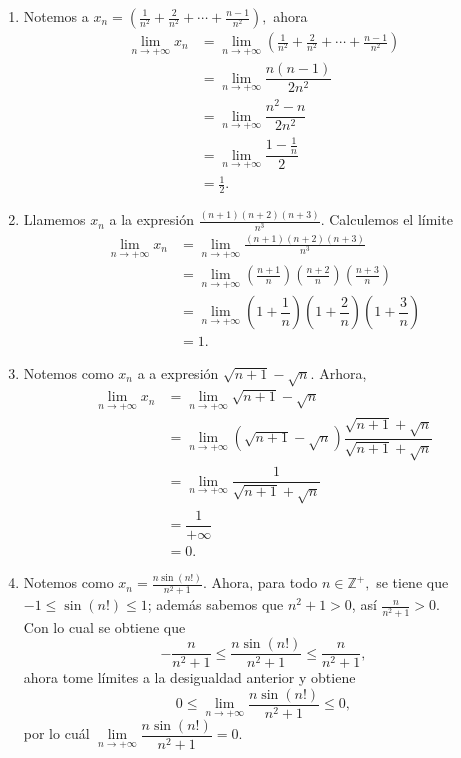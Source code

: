 	\begin{example}
		\begin{enumerate}
			\item Notemos a \(x_n=\left(\frac{1}{n^2}+\frac{2}{n^2}+\cdots+\frac{n-1}{n^2}\right),\) ahora
			\begin{align*}
			\lim\limits_{n\to+\infty}{x_n}&=\lim\limits_{n\to+\infty}\left(\frac{1}{n^2}+\frac{2}{n^2}+\cdots+\frac{n-1}{n^2}\right)\\
			&=\lim\limits_{n\to+\infty}\dfrac{n(n-1)}{2n^2}\\
			&=\lim\limits_{n\to+\infty}{\dfrac{n^2-n}{2n^2}}\\
			&=\lim\limits_{n\to+\infty}{\dfrac{1-\frac{1}{n}}{2}}\\
			&=\frac{1}{2}.
			\end{align*}
			
			\item Llamemos \(x_n\) a la expresi\'on \(\frac{(n+1)(n+2)(n+3)}{n^3}.\) Calculemos el l\'imite
			\begin{align*}
			\lim\limits_{n\to+\infty}{x_n}&=\lim\limits_{n\to+\infty}{\frac{(n+1)(n+2)(n+3)}{n^3}}\\
			&=\lim\limits_{n\to+\infty}{\left(\frac{n+1}{n}\right)\left(\frac{n+2}{n}\right)\left(\frac{n+3}{n}\right)}\\
			&=\lim\limits_{n\to+\infty}{\left(1+\dfrac{1}{n}\right)\left(1+\dfrac{2}{n}\right)\left(1+\dfrac{3}{n}\right)}\\
			&=1.
			\end{align*}
			\item Notemos como \(x_n\) a a expresi\'on \(\sqrt{n+1}-\sqrt{n}.\)
			Arhora,
			\begin{align*}
			\lim\limits_{n\to+\infty}{x_n}&=\lim\limits_{n\to+\infty}{\sqrt{n+1}-\sqrt{n}}\\
			&=\lim\limits_{n\to+\infty}{\left(\sqrt{n+1}-\sqrt{n}\right)\dfrac{\sqrt{n+1}+\sqrt{n}}{\sqrt{n+1}+\sqrt{n}}}\\
			&=\lim\limits_{n\to+\infty}{\dfrac{1}{\sqrt{n+1}+\sqrt{n}}}\\
			&=\dfrac{1}{+\infty}\\
			&=0.
			\end{align*}
			\item Notemos como \(x_n=\frac{n\sin(n!)}{n^2+1}.\) Ahora, para todo \(n\in \mathbb{Z}^{+},\) se tiene que \(-1\leq \sin(n!)\leq 1\); adem\'as sabemos que \(n^2+1> 0\), as\'i \(\frac{n}{n^2+1}>0.\)\\
			Con lo cual se obtiene que
			\[-\dfrac{n}{n^2+1}\leq\dfrac{n\sin(n!)}{n^2+1}\leq\dfrac{n}{n^2+1},\]
			ahora tome l\'imites a la desigualdad anterior y obtiene
			\[0\leq\lim\limits_{n\to+\infty}\dfrac{n\sin(n!)}{n^2+1}\leq0,\]
			por lo cu\'al \(\lim\limits_{n\to+\infty}\dfrac{n\sin(n!)}{n^2+1}=0.\)
		\end{enumerate}
		
	\end{example}

